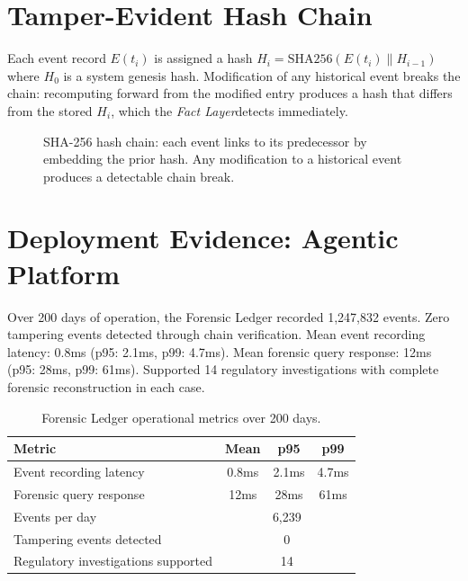 \documentclass[12pt]{article}
\newcommand{\fact}{\textit{Fact Layer}}
\begin{document}
\section{Tamper-Evident Hash Chain}
\label{sec:hash-chain}

Each event record $E(t_i)$ is assigned a hash $H_i = \text{SHA256}(E(t_i) \parallel H_{i-1})$ where $H_0$ is a system genesis hash. Modification of any historical event breaks the chain: recomputing forward from the modified entry produces a hash that differs from the stored $H_i$, which the \fact detects immediately.

\begin{figure}[htbp]
\centering
\caption{SHA-256 hash chain: each event links to its predecessor by embedding the prior hash. Any modification to a historical event produces a detectable chain break.}
\label{fig:hash-chain}
\end{figure}

\section{Deployment Evidence: Agentic Platform}
\label{sec:deployment}

Over 200 days of operation, the Forensic Ledger recorded 1,247,832 events. Zero tampering events detected through chain verification. Mean event recording latency: 0.8ms (p95: 2.1ms, p99: 4.7ms). Mean forensic query response: 12ms (p95: 28ms, p99: 61ms). Supported 14 regulatory investigations with complete forensic reconstruction in each case.

\begin{table}[htbp]
\centering
\caption{Forensic Ledger operational metrics over 200 days.}
\label{tab:operational-metrics}
\begin{tabular}{lccc}
\toprule
\textbf{Metric} & \textbf{Mean} & \textbf{p95} & \textbf{p99} \\
\midrule
Event recording latency & 0.8ms & 2.1ms & 4.7ms \\
Forensic query response & 12ms & 28ms & 61ms \\
Events per day & \multicolumn{3}{c}{6,239} \\
Tampering events detected & \multicolumn{3}{c}{0} \\
Regulatory investigations supported & \multicolumn{3}{c}{14} \\
\bottomrule
\end{tabular}
\end{table}
\end{document}
